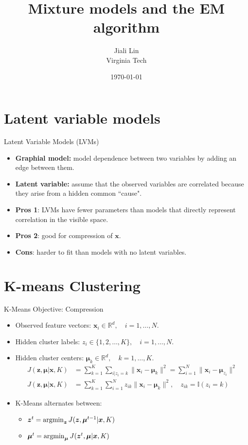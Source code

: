\documentclass[10pt,mathserif]{beamer}
\title{\large \bfseries Mixture models and the EM algorithm}
\author{Jiali Lin\\[3ex]
Virginia Tech}
\date{\today}
\begin{document}
\frame{
\thispagestyle{empty}
\titlepage
}

\section{Latent variable models}
\begin{frame}{Latent Variable Models (LVMs)}
\begin{itemize}
    \item \textbf{Graphial model:} model dependence between two variables by adding an edge between them.
    \item \textbf{Latent variable:} assume that the observed variables are correlated because they arise from a hidden common ``cause".
    \item \textbf{Pros 1}: LVMs have fewer parameters than models that directly represent correlation in the visible space.
    \item \textbf{Pros 2}: good for compression of $\bm{x}$.
    \item \textbf{Cons}: harder to fit than models with no latent variables.
\end{itemize}
\end{frame}

\section{K-means Clustering}
\begin{frame}{K-Means Objective: Compression}
\begin{itemize}
    \item Observed feature vectors: $\bm{x}_i\in\mathbb{R}^d, \quad i=1,\ldots,N$.
    \item Hidden cluster labels: $z_i\in\{1,2,\ldots,K\}, \quad i=1,\ldots,N$.
    \item Hidden cluster centers: $\bm{\mu}_k\in\mathbb{R}^d, \quad k=1,\ldots,K$.
    \begin{equation*}
        \begin{split}
            J(\bm{z},\bm{\mu}|\bm{x},K) & = \sum_{k=1}^K \sum_{i|z_i=k}\|\bm{x}_i-\bm{\mu}_k\|^2 = \sum_{i=1}^N \|\bm{x}_i-\bm{\mu}_{z_i}\|^2\\
            J(\bm{z},\bm{\mu}|\bm{x},K) & = \sum_{k=1}^K \sum_{i=1}^N z_{ik}\|\bm{x}_i-\bm{\mu}_k\|^2, \quad z_{ik} = \mathbb{I}(z_i = k)
        \end{split}
    \end{equation*}
    \item K-Means alternates between:
    \begin{itemize}
        \item $\bm{z}^{t} = \mathop{\rm argmin}_{\bm{z}} J(\bm{z},\bm{\mu}^{t-1}|\bm{x},K)$
        \item $\bm{\mu}^{t} = \mathop{\rm argmin}_{\bm{\mu}} J(\bm{z}^t,\bm{\mu}|\bm{x},K)$    
    \end{itemize}
\end{itemize}
\end{frame}
\end{document}
